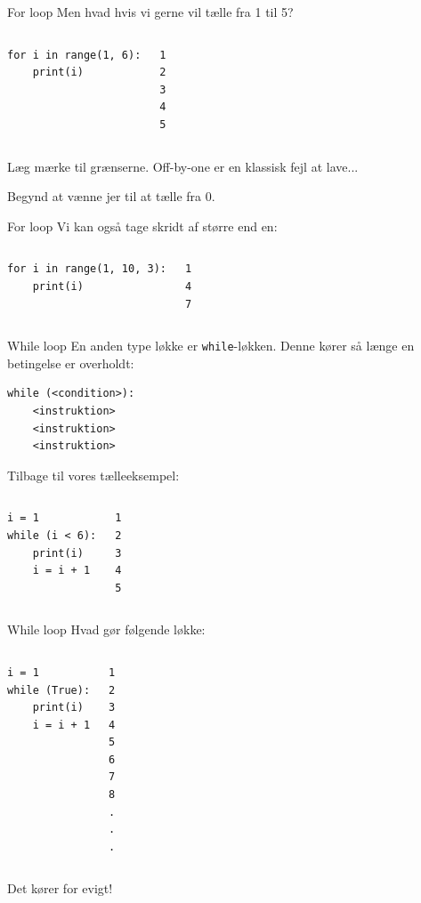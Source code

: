 \begin{frame}[fragile]{For loop}
	Men hvad hvis vi gerne vil tælle fra 1 til 5?
	\pause
	\begin{columns}
		\begin{lstlisting}[style=python]
for i in range(1, 6):
	print(i)
		\end{lstlisting}
				\begin{lstlisting}[style=python]
1
2
3
4
5
		\end{lstlisting}
	\end{columns}
	Læg mærke til grænserne. Off-by-one er en klassisk fejl at lave...
	
	Begynd at vænne jer til at tælle fra 0.
\end{frame}

\begin{frame}[fragile]{For loop}
	Vi kan også tage skridt af større end en:
	\begin{columns}
		\column{0.4\textwidth}
		\begin{lstlisting}[style=python]
for i in range(1, 10, 3):
	print(i)
		\end{lstlisting}
		\column{0.4\textwidth}
				\begin{lstlisting}[style=python]
1
4
7
		\end{lstlisting}
	\end{columns}
\end{frame}


\begin{frame}[fragile]{While loop}
	En anden type løkke er \texttt{while}-løkken. Denne kører så længe en betingelse er overholdt:
		\begin{lstlisting}[style=python]
while (<condition>):
	<instruktion>
	<instruktion>
	<instruktion>
		\end{lstlisting}
	Tilbage til vores tælleeksempel:
	\begin{columns}
		\begin{lstlisting}[style=python]
i = 1
while (i < 6):
	print(i)
	i = i + 1
		\end{lstlisting}
		\begin{lstlisting}[style=python]
1
2
3
4
5
		\end{lstlisting}
	\end{columns}
\end{frame}

\begin{frame}[fragile]{While loop}
	Hvad gør følgende løkke:
	\begin{columns}
		\column{0.4\textwidth}
		\begin{lstlisting}[style=python]
i = 1
while (True):
	print(i)
	i = i + 1
		\end{lstlisting}
		\pause
		\column{0.4\textwidth}
		\begin{lstlisting}[style=python]
1
2
3
4
5
6
7
8
.
.
.
		\end{lstlisting}
	\end{columns}
	Det kører for evigt!
\end{frame}



